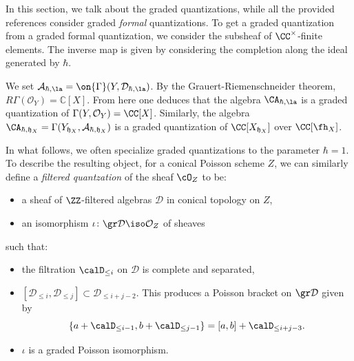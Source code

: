\documentclass[12pt]{amsart}
\newcommand{\CO}{\mathcal{O}}
\begin{document}
   \begin{warning}
       In this section, we talk about the graded quantizations, while all the provided references consider graded \emph{formal} quantizations. To get a graded quantization from a graded formal quantization, we consider the subsheaf of $\CC^\times$-finite elements. The inverse map is given by considering the completion along the ideal generated by $\hbar$. 
   \end{warning}
 We set $\mathcal{A}_{\hbar, \la}=\on{\Gamma}(Y,\mathcal{D}_{\hbar, \la})$. By the Grauert-Riemenschneider theorem, $R\Gamma(\mathcal{O}_{Y})=\mathbb{C}[X]$. From here one deduces that the algebra $\CA_{\hbar, \la}$ is a graded quantization of $\Gamma(Y,\CO_{Y})=\CC[X]$. Similarly, the algebra $\CA_{\hbar, \mathfrak{h}_X}=\Gamma(Y_{\mathfrak{h}_X},\mathcal{A}_{\hbar, \mathfrak{h}_X})$ is a graded quantization of $\CC[X_{\mathfrak{h}_X}]$ over $\CC[\fh_X]$.

In what follows, we often specialize graded quantizations to the parameter $\hbar=1$. To describe the resulting object, for a conical Poisson scheme $Z$, we can similarly define a \emph{filtered quantzation} of the sheaf $\cO_Z$ to be:

 \begin{itemize}

 \item  a sheaf of $\ZZ$-filtered algebras $\mathcal{D}$ in conical topology on $Z$,


 \item an isomorphism $\iota \colon \gr \mathcal{D} \iso \CO_Z$ of sheaves

 \end{itemize} 
 such that:
	
	
	\begin{itemize}
		
		\item the filtration $\calD_{\le i}$ on $\mathcal{D}$ is complete and separated, 
		
        \item $[\mathcal{D}_{\le i},\mathcal{D}_{\le j}] \subset \mathcal{D}_{\le i+j-2}$. This produces a Poisson bracket on $\gr \mathcal{D}$ given by
        \begin{equation*}
        \{a+\calD_{\le i-1}, b+\calD_{\le j-1}\}=[a,b]+\calD_{\le i+j-3}.
        \end{equation*}

        \item $\iota$ is a graded Poisson isomorphism.
		
	\end{itemize}
\end{document}
